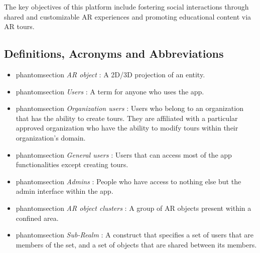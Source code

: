 \documentclass{article}
\makeatletter
\newcommand{\labeltext}[3][]{%
    \@bsphack%
    \csname phantomsection\endcsname%
    \def\tst{#1}%
    \def\labelmarkup{\emph}%
    \def\refmarkup{}%
    \ifx\tst\empty\def\@currentlabel{\refmarkup{#2}}{\label{#3}}%
    \else\def\@currentlabel{\refmarkup{#1}}{\label{#3}}\fi%
    \@esphack%
    \labelmarkup{#2}%
}
\makeatother
\begin{document}
The key objectives of this platform include fostering social interactions through shared and customizable AR experiences and promoting educational content via AR tours.

\subsection{Definitions, Acronyms and Abbreviations}
\label{sub:def_acr_abb}

\begin{itemize}
    \item \labeltext{AR object}{def:ar_obj}: A 2D/3D projection of an entity.
    \item \labeltext{Users}{def:user}: A term for anyone who uses the app.
    \item \labeltext{Organization users}{def:org_user}: Users who belong to an organization that has the ability to create tours. They are affiliated with a particular approved organization who have the ability to modify tours within their organization’s domain.
    \item \labeltext{General users}{def:gen_user}: Users that can access most of the app functionalities except creating tours.
    \item \labeltext{Admins}{def:admin}: People who have access to nothing else but the admin interface within the app.
    \item \labeltext{AR object clusters}{def:ar_obj_cls}: A group of AR objects present within a confined area.
    \item \labeltext{Sub-Realm}{def:sub_realm}: A construct that specifies a set of users that are members of the set, and a set of objects that are shared between its members.
\end{itemize}
\end{document}

